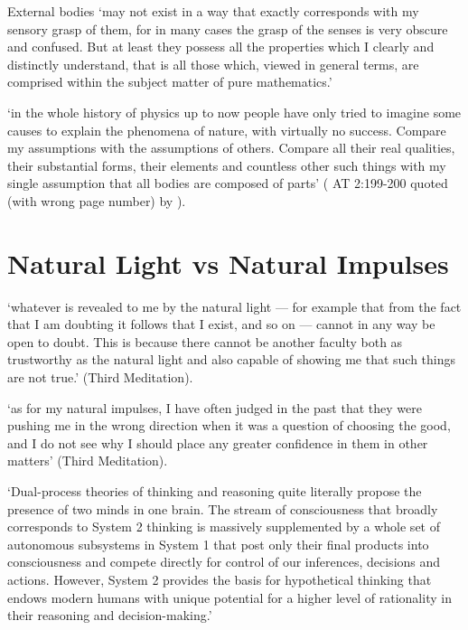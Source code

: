 \documentclass[12pt]{extarticle}
\begin{document}
\begin{multicols*}{3}
External bodies 
‘may not exist in a way that 
exactly corresponds with my  sensory grasp of them, 
for in many cases the 
grasp of the senses
 is very obscure and confused. 
But at least they possess all the properties which  I clearly and distinctly understand, 
that is all those which, viewed in general terms, are comprised within the subject matter of pure mathematics.’
 
‘in the whole history of physics up to now people have
only tried to imagine some causes to explain the phenomena of nature, with
virtually no success.
Compare my assumptions with the assumptions of others.
Compare all their real qualities, their substantial forms, their elements and
countless other such things
with 
my single assumption that 
all bodies are composed of parts’
(\citealp[p.~107]{descartes:1984_vol3} AT 2:199-200 quoted (with wrong page number) by \citealp{sorell:2018_experimental}).
 
 
 
 
 
 
\section{Natural Light vs Natural Impulses}
 
‘whatever is revealed to me by the natural light — for example that from the fact that I
am doubting it follows that I exist, and so on — cannot in any way be open to doubt.
This is because there cannot be another faculty both as trustworthy as the natural
light and also capable of showing me that such things are not true.’
(Third Meditation).
 
‘as for my natural impulses, I have often judged in the past that they were pushing me in the wrong direction when it
was a question of choosing the good, and I do not see why I should place any greater confidence in them in other
matters’
(Third Meditation).
 
‘Dual-process theories of thinking and reasoning quite literally propose the presence of two minds in one brain. The stream of consciousness that broadly corresponds to System 2 thinking is massively supplemented by a whole set of autonomous subsystems in System 1 that post only their final products into consciousness and compete directly for control of our inferences, decisions and actions. However, System 2 provides the basis for hypothetical thinking that endows modern humans with unique potential for a higher level of rationality in their reasoning and decision-making.’
\citep[p.~458]{evans:2003_two}
 

\end{multicols*}
\end{document}
